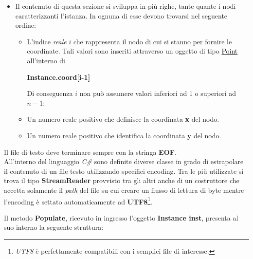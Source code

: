 \documentclass[11pt]{article}
\begin{document}
\begin{itemize}
\begin{itemize}
    \item Il contenuto di questa sezione si sviluppa in più righe, tante quante i nodi caratterizzanti l'istanza. In ognuna di esse devono trovarsi nel seguente ordine:
    \begin{itemize}
    \item L'indice \textit{reale} $i$ che rappresenta il nodo di cui si stanno per fornire le coordinate. Tali valori sono inseriti attraverso un oggetto di tipo \hyperref[sec:ClassePointS]{Point} all'interno di 
    \begin{center}
        \textbf{Instance.coord[i-1]}
    \end{center}
    Di conseguenza $i$ non può assumere valori inferiori ad \textbf{$1$} o superiori ad \textbf{$n-1$};
    \item Un numero reale positivo che definisce la coordinata \textbf{x} del nodo.
    \item Un numero reale positivo che identifica la coordinata \textbf{y} del nodo.
    \end{itemize}
    \end{itemize}
\end{itemize}

Il file di testo deve terminare sempre con la stringa \textbf{EOF}.\\

All'interno del linguaggio \textit{C\#} sono definite diverse classe in grado di estrapolare il contenuto di un file testo utilizzando specifici encoding. Tra le più utilizzate si trova il tipo \textbf{StreamReader} provvisto tra gli altri anche di un costruttore che accetta solamente il \textit{path} del file su cui creare un flusso di lettura di byte mentre l'encoding è settato automaticamente ad \textbf{UTF8}\footnote{\textit{UTF8} è perfettamente compatibili con i semplici file di interesse.}.

Il metodo \textbf{Populate}, ricevuto in ingresso l'oggetto \textbf{Instance inst}, presenta al suo interno la seguente struttura:
\end{document}
